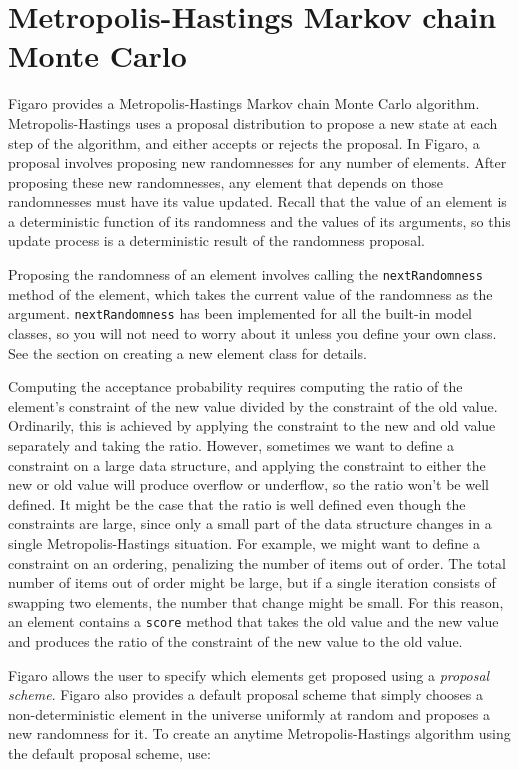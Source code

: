 \section{Metropolis-Hastings Markov chain Monte Carlo}

Figaro provides a Metropolis-Hastings Markov chain Monte Carlo algorithm. Metropolis-Hastings uses a proposal distribution to propose a new state at each step of the algorithm, and either accepts or rejects the proposal. In Figaro, a proposal involves proposing new randomnesses for any number of elements. After proposing these new randomnesses, any element that depends on those randomnesses must have its value updated. Recall that the value of an element is a deterministic function of its randomness and the values of its arguments, so this update process is a deterministic result of the randomness proposal.

Proposing the randomness of an element involves calling the \texttt{next\-Randomness} method of the element, which takes the current value of the randomness as the argument. \texttt{nextRandomness} has been implemented for all the built-in model classes, so you will not need to worry about it unless you define your own class. See the section on creating a new element class for details.

Computing the acceptance probability requires computing the ratio of the element's constraint of the new value divided by the constraint of the old value. Ordinarily, this is achieved by applying the
constraint to the new and old value separately and taking the ratio. However, sometimes we want to define a constraint on a large data structure, and applying the constraint to either the new or old value will produce overflow or underflow, so the ratio won't be well defined. It might be the case that the ratio is well defined even though the constraints are large, since only a small part of the data structure changes in a single Metropolis-Hastings situation. For example, we might want to define a constraint on an ordering, penalizing the number of items out of order. The total number of items out of order might be large, but if a single iteration consists of swapping two elements, the number that change might be small. For this reason, an element contains a \texttt{score} method that takes the old value and the new value and produces the ratio of the constraint of the new value to the old value.

Figaro allows the user to specify which elements get proposed using a \emph{proposal scheme}. Figaro also provides a default proposal scheme that simply chooses a non-deterministic element in the universe uniformly at random and proposes a new randomness for it. To create an anytime Metropolis-Hastings algorithm using the default proposal scheme, use:

